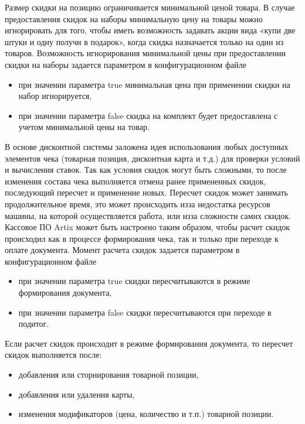 \documentclass[letterpaper,10pt,russian]{sphinxmanual}
\begin{document}
\sphinxAtStartPar
Размер скидки на позицию ограничивается минимальной ценой товара. В случае предоставления скидок на наборы минимальную цену
на товары можно игнорировать для того, чтобы иметь возможность задавать акции вида «купи две штуки и одну получи в подарок»,
когда скидка назначается только на один из товаров. Возможность игнорирования минимальной цены при предоставлении скидки
на наборы задается параметром  в конфигурационном файле 
\begin{itemize}
\item {} 
\sphinxAtStartPar
при значении параметра true минимальная цена при применении скидки на набор игнорируется,

\item {} 
\sphinxAtStartPar
при значении параметра false скидка на комплект будет предоставлена с учетом минимальной цены на товар.

\end{itemize}

\sphinxAtStartPar
В основе дисконтной системы заложена идея использования любых доступных элементов чека (товарная позиция, дисконтная карта и т.д.)
для проверки условий и вычисления ставок. Так как условия скидок могут быть сложными, то после изменения состава чека выполняется
отмена ранее примененных скидок, последующий пересчет и применение новых. Пересчет скидок может занимать продолжительное время,
это может происходить из\sphinxhyphen{}за недостатка ресурсов машины, на которой осуществляется работа, или из\sphinxhyphen{}за сложности самих скидок.
Кассовое ПО Artix может быть настроено таким образом, чтобы расчет скидок происходил как в процессе формирования чека,
так и только при переходе к оплате документа. Момент расчета скидок задается параметром 
в конфигурационном файле 
\begin{itemize}
\item {} 
\sphinxAtStartPar
при значении параметра true скидки пересчитываются в режиме формирования документа,

\item {} 
\sphinxAtStartPar
при значении параметра false скидки пересчитываются при переходе в подитог.

\end{itemize}

\sphinxAtStartPar
Если расчет скидок происходит в режиме формирования документа, то пересчет скидок выполняется после:
\begin{itemize}
\item {} 
\sphinxAtStartPar
добавления или сторнирования товарной позиции,

\item {} 
\sphinxAtStartPar
добавления или удаления карты,

\item {} 
\sphinxAtStartPar
изменения модификаторов (цена, количество и т.п.) товарной позиции.

\end{itemize}
\end{document}
